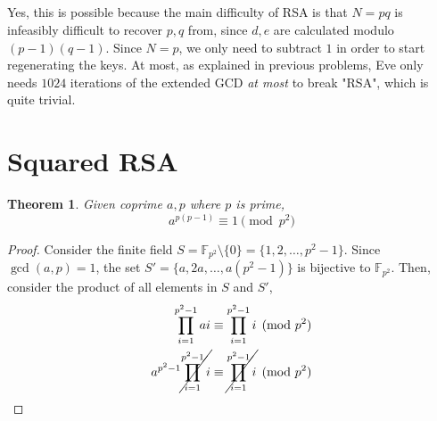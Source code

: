 \documentclass{article}
\newtheorem{theorem}{Theorem}
\begin{document}
\subsection{}

Yes, this is possible because the main difficulty of RSA is that \(N = pq\) is infeasibly difficult to recover \(p, q\) from, since \(d, e\) are calculated modulo \((p - 1) (q - 1)\).
Since \(N = p\), we only need to subtract \(1\) in order to start regenerating the keys.
At most, as explained in previous problems, Eve only needs \(1024\) iterations of the extended GCD \emph{at most} to break "RSA", which is quite trivial.

\section{Squared RSA}

\begin{theorem}
    Given coprime \(a, p\) where \(p\) is prime,
    \begin{equation}
        a^{p (p - 1)} \equiv 1 \pmod{p^2}
    \end{equation}
\end{theorem}
\begin{proof}
    Consider the finite field \(S = \mathbb{F}_{p^2} \setminus \{0\} = \{1, 2, \ldots, p^2 - 1\}\).
    Since \(\gcd(a, p) = 1\), the set \(S' = \{a, 2a, \ldots, a (p^2 - 1)\}\) is bijective to \(\mathbb{F}_{p^2}\).
    Then, consider the product of all elements in \(S\) and \(S'\),
    \begin{align}
        \prod_{i = 1}^{p^2 - 1} a i &\equiv \prod_{i = 1}^{p^2 - 1} i \pmod{p^2} \\
        a^{p^2 - 1} \cancel{\prod_{i = 1}^{p^2 - 1} i} &\equiv \cancel{\prod_{i = 1}^{p^2 - 1} i} \pmod{p^2}
    \end{align}
\end{proof}
\end{document}
